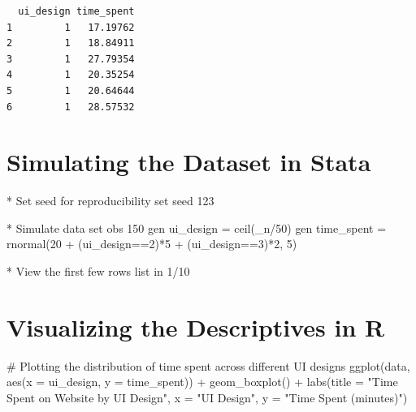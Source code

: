 \documentclass[
  letterpaper,
  DIV=11,
  numbers=noendperiod]{scrreprt}
\newenvironment{Shaded}{\begin{snugshade}}{\end{snugshade}}
\newcommand{\AttributeTok}[1]{\textcolor[rgb]{0.40,0.45,0.13}{#1}}
\newcommand{\BaseNTok}[1]{\textcolor[rgb]{0.68,0.00,0.00}{#1}}
\newcommand{\CommentTok}[1]{\textcolor[rgb]{0.37,0.37,0.37}{#1}}
\newcommand{\DataTypeTok}[1]{\textcolor[rgb]{0.68,0.00,0.00}{#1}}
\newcommand{\DecValTok}[1]{\textcolor[rgb]{0.68,0.00,0.00}{#1}}
\newcommand{\FunctionTok}[1]{\textcolor[rgb]{0.28,0.35,0.67}{#1}}
\newcommand{\KeywordTok}[1]{\textcolor[rgb]{0.00,0.23,0.31}{#1}}
\newcommand{\NormalTok}[1]{\textcolor[rgb]{0.00,0.23,0.31}{#1}}
\newcommand{\OtherTok}[1]{\textcolor[rgb]{0.00,0.23,0.31}{#1}}
\newcommand{\SpecialCharTok}[1]{\textcolor[rgb]{0.37,0.37,0.37}{#1}}
\newcommand{\StringTok}[1]{\textcolor[rgb]{0.13,0.47,0.30}{#1}}
\begin{document}
\begin{verbatim}
  ui_design time_spent
1         1   17.19762
2         1   18.84911
3         1   27.79354
4         1   20.35254
5         1   20.64644
6         1   28.57532
\end{verbatim}

\section{Simulating the Dataset in
Stata}\label{simulating-the-dataset-in-stata}

\begin{Shaded}
\begin{Highlighting}[]
\NormalTok{* Set }\DecValTok{seed} \KeywordTok{for}\NormalTok{ reproducibility}
\KeywordTok{set} \DecValTok{seed}\NormalTok{ 123}

\NormalTok{* Simulate }\KeywordTok{data}
\KeywordTok{set} \KeywordTok{obs}\NormalTok{ 150}
\KeywordTok{gen}\NormalTok{ ui\_design = }\FunctionTok{ceil}\NormalTok{(}\DataTypeTok{\_n}\NormalTok{/50)}
\KeywordTok{gen}\NormalTok{ time\_spent = rnormal(20 + (ui\_design==2)*5 + (ui\_design==3)*2, 5)}

\NormalTok{* View the first few }\BaseNTok{rows}
\OtherTok{list} \KeywordTok{in}\NormalTok{ 1/10}
\end{Highlighting}
\end{Shaded}

\section{Visualizing the Descriptives in
R}\label{visualizing-the-descriptives-in-r}

\begin{Shaded}
\begin{Highlighting}[]
\CommentTok{\# Plotting the distribution of time spent across different UI designs}
\FunctionTok{ggplot}\NormalTok{(data, }\FunctionTok{aes}\NormalTok{(}\AttributeTok{x =}\NormalTok{ ui\_design, }\AttributeTok{y =}\NormalTok{ time\_spent)) }\SpecialCharTok{+}
  \FunctionTok{geom\_boxplot}\NormalTok{() }\SpecialCharTok{+}
  \FunctionTok{labs}\NormalTok{(}\AttributeTok{title =} \StringTok{"Time Spent on Website by UI Design"}\NormalTok{,}
       \AttributeTok{x =} \StringTok{"UI Design"}\NormalTok{,}
       \AttributeTok{y =} \StringTok{"Time Spent (minutes)"}\NormalTok{)}
\end{Highlighting}
\end{Shaded}
\end{document}
